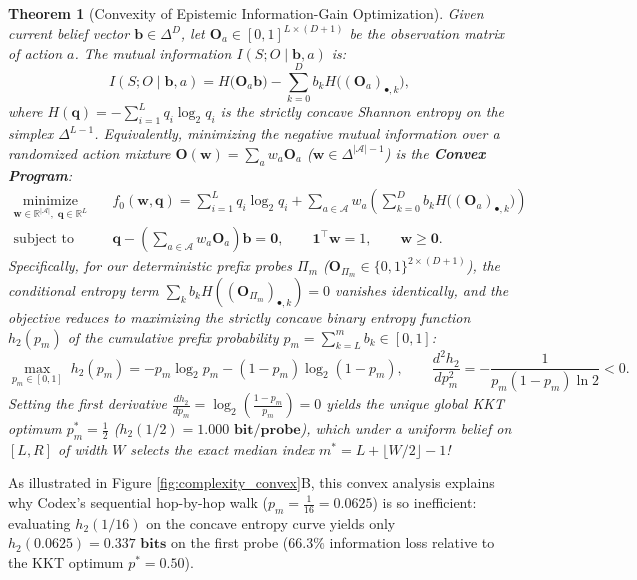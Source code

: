 \documentclass[11pt,a4paper]{article}
\newtheorem{theorem}{Theorem}[section]
\theoremstyle{definition}
\theoremstyle{remark}
\begin{document}
\begin{theorem}[Convexity of Epistemic Information-Gain Optimization]
Given current belief vector $\bm{b} \in \Delta^D$, let $\mathbf{O}_a \in [0,1]^{L \times (D+1)}$ be the observation matrix of action $a$. The mutual information $I(S; O \mid \bm{b}, a)$ is:
\begin{equation}
    I(S; O \mid \bm{b}, a) = H\big(\mathbf{O}_a \bm{b}\big) - \sum_{k=0}^{D} b_k H\big((\mathbf{O}_a)_{\bullet, k}\big),
\end{equation}
where $H(\bm{q}) = -\sum_{i=1}^{L} q_i \log_2 q_i$ is the strictly concave Shannon entropy on the simplex $\Delta^{L-1}$. Equivalently, minimizing the negative mutual information over a randomized action mixture $\mathbf{O}(\bm{w}) = \sum_{a} w_a \mathbf{O}_a$ ($\bm{w} \in \Delta^{|\mathcal{A}|-1}$) is the \textbf{Convex Program}:
\begin{align}
    \underset{\bm{w} \in \mathbb{R}^{|\mathcal{A}|}, \; \bm{q} \in \mathbb{R}^L}{\text{minimize}} \quad & f_0(\bm{w}, \bm{q}) = \sum_{i=1}^{L} q_i \log_2 q_i + \sum_{a \in \mathcal{A}} w_a \left( \sum_{k=0}^{D} b_k H\big((\mathbf{O}_a)_{\bullet, k}\big) \right) \\
    \text{subject to} \quad & \bm{q} - \left(\sum_{a \in \mathcal{A}} w_a \mathbf{O}_a\right) \bm{b} = \bm{0}, \qquad \bm{1}^\top \bm{w} = 1, \qquad \bm{w} \ge \bm{0}.
\end{align}
Specifically, for our deterministic prefix probes $\Pi_m$ ($\mathbf{O}_{\Pi_m} \in \{0,1\}^{2\times(D+1)}$), the conditional entropy term $\sum_k b_k H((\mathbf{O}_{\Pi_m})_{\bullet,k}) = 0$ vanishes identically, and the objective reduces to maximizing the strictly concave binary entropy function $h_2(p_m)$ of the cumulative prefix probability $p_m = \sum_{k=L}^{m} b_k \in [0,1]$:
\begin{equation}
    \max_{p_m \in [0,1]} \; h_2(p_m) = -p_m \log_2 p_m - (1 - p_m)\log_2(1 - p_m), \qquad \frac{d^2 h_2}{dp_m^2} = -\frac{1}{p_m(1 - p_m)\ln 2} < 0.
\end{equation}
Setting the first derivative $\frac{dh_2}{dp_m} = \log_2\left(\frac{1 - p_m}{p_m}\right) = 0$ yields the unique global KKT optimum $p_m^* = \frac{1}{2}$ ($h_2(1/2) = \mathbf{1.000\text{ bit/probe}}$), which under a uniform belief on $[L, R]$ of width $W$ selects the exact median index $m^* = L + \lfloor W/2 \rfloor - 1$!
\end{theorem}

As illustrated in Figure \ref{fig:complexity_convex}B, this convex analysis explains why Codex's sequential hop-by-hop walk ($p_m = \frac{1}{16} = 0.0625$) is so inefficient: evaluating $h_2(1/16)$ on the concave entropy curve yields only $h_2(0.0625) = \mathbf{0.337\text{ bits}}$ on the first probe ($66.3\%$ information loss relative to the KKT optimum $p^* = 0.50$).
\end{document}
